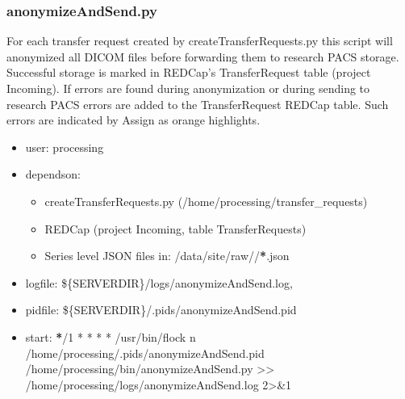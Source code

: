 \documentclass[letterpaper,10pt,english]{sphinxmanual}
\begin{document}
\subsubsection{anonymizeAndSend.py}
\label{\detokenize{Architecture/scripts/anonymizeAndSend:anonymizeandsend-py}}\label{\detokenize{Architecture/scripts/anonymizeAndSend::doc}}
\sphinxAtStartPar
For each transfer request created by createTransferRequests.py this script will anonymized all DICOM files before forwarding them to research PACS storage. Successful storage is marked in REDCap’s TransferRequest table (project Incoming). If errors are found during anonymization or during sending to research PACS errors are added to the TransferRequest REDCap table. Such errors are indicated by Assign as orange highlights.
\begin{itemize}
\item {} 
\sphinxAtStartPar
user: processing

\item {} 
\sphinxAtStartPar
depends\sphinxhyphen{}on:
\begin{itemize}
\item {} 
\sphinxAtStartPar
createTransferRequests.py (/home/processing/transfer\_requests)

\item {} 
\sphinxAtStartPar
REDCap  (project Incoming, table TransferRequests)

\item {} 
\sphinxAtStartPar
Series level JSON files in: /data/site/raw/\sphinxstyleemphasis{/}/{\color{red}\bfseries{}*}.json

\end{itemize}

\item {} 
\sphinxAtStartPar
log\sphinxhyphen{}file:
\sphinxhyphen{} \$\{SERVERDIR\}/logs/anonymizeAndSend.log,

\item {} 
\sphinxAtStartPar
pid\sphinxhyphen{}file: \$\{SERVERDIR\}/.pids/anonymizeAndSend.pid

\item {} 
\sphinxAtStartPar
start:
{\color{red}\bfseries{}*}/1 * * * *  /usr/bin/flock \sphinxhyphen{}n /home/processing/.pids/anonymizeAndSend.pid /home/processing/bin/anonymizeAndSend.py \textgreater{}\textgreater{} /home/processing/logs/anonymizeAndSend.log 2\textgreater{}\&1

\end{itemize}
\end{document}
